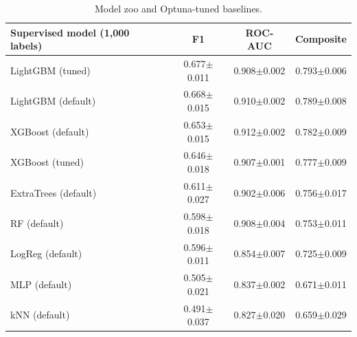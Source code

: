 \begin{table}[H]
\centering\small
\begin{tabular}{lccc}
\toprule
Supervised model (1,000 labels) & F1 & ROC-AUC & Composite\\
\midrule
LightGBM (tuned) & 0.677$\pm$0.011 & 0.908$\pm$0.002 & 0.793$\pm$0.006 \\
LightGBM (default) & 0.668$\pm$0.015 & 0.910$\pm$0.002 & 0.789$\pm$0.008 \\
XGBoost (default) & 0.653$\pm$0.015 & 0.912$\pm$0.002 & 0.782$\pm$0.009 \\
XGBoost (tuned) & 0.646$\pm$0.018 & 0.907$\pm$0.001 & 0.777$\pm$0.009 \\
ExtraTrees (default) & 0.611$\pm$0.027 & 0.902$\pm$0.006 & 0.756$\pm$0.017 \\
RF (default) & 0.598$\pm$0.018 & 0.908$\pm$0.004 & 0.753$\pm$0.011 \\
LogReg (default) & 0.596$\pm$0.011 & 0.854$\pm$0.007 & 0.725$\pm$0.009 \\
MLP (default) & 0.505$\pm$0.021 & 0.837$\pm$0.002 & 0.671$\pm$0.011 \\
kNN (default) & 0.491$\pm$0.037 & 0.827$\pm$0.020 & 0.659$\pm$0.029 \\
\bottomrule
\end{tabular}
\caption*{Model zoo and Optuna-tuned baselines.}
\end{table}

